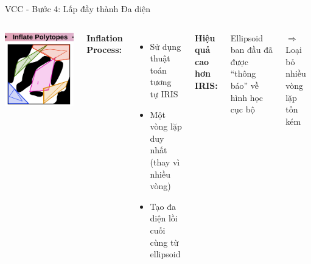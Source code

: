 \documentclass[aspectratio=169]{beamer}
\begin{document}
\begin{frame}{VCC - Bước 4: Lấp đầy thành Đa diện}
    \begin{columns}[c]
        \centering
        \includegraphics[width=\textwidth]{../imgs/VCC-4.png}

        \textbf{Inflation Process:}
        \begin{itemize}
            \item Sử dụng thuật toán tương tự IRIS
            \item Một vòng lặp duy nhất (thay vì nhiều vòng)
            \item Tạo đa diện lồi cuối cùng từ ellipsoid
        \end{itemize}

        \vspace{0.5em}
        \textbf{Hiệu quả cao hơn IRIS:}
        
        Ellipsoid ban đầu đã được ``thông báo'' về hình học cục bộ
        
        $\Rightarrow$ Loại bỏ nhiều vòng lặp tốn kém
    \end{columns}
\end{frame}
\end{document}
